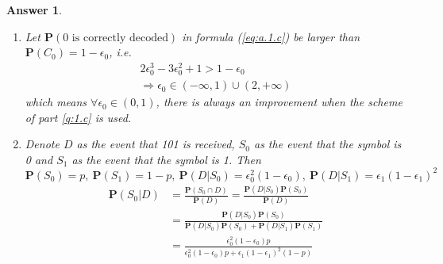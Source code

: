 \documentclass[utf8]{article}
\theoremstyle{definition}%
\theoremstyle{plain}%
\newtheorem{answer}{Answer} %
\begin{document}
\begin{answer}
\begin{enumerate}[label=(\alph*)]
\begin{equation}
    \end{equation}
    Thus, the probability that a 0 is correctly decoded is
    \begin{equation}
    \begin{aligned}
        \label{eq:a.1.c}
        \mathbf{P}(\text{0 is correctly decoded}) &= \mathbf{P}(Z_2) + \mathbf{P}(Z_3) \\
        &= 3(1-\epsilon_0)^2\epsilon_0 + (1-\epsilon_0)^3 \\ 
        &= 2\epsilon_0^3 - 3\epsilon_0^2 + 1
    \end{aligned}
    \end{equation}
    P.S. We do not take the situation into consideration that the sender sends 1 and the receiver decodes it as 0.
    \item Let $\mathbf{P}(\text{0 is correctly decoded})$ in formula (\ref{eq:a.1.c}) be larger than $\mathbf{P}(C_0) = 1-\epsilon_0$, i.e.
    \begin{equation}
    \begin{aligned}
        2\epsilon_0^3 - 3\epsilon_0^2 + 1 > 1-\epsilon_0 \\ 
        \Rightarrow \epsilon_0 \in (-\infty, 1) \cup (2, +\infty)
    \end{aligned}
    \end{equation}
    which means $\forall \epsilon_0 \in (0, 1)$, there is always an improvement when the scheme of part \ref{q:1.c} is used.
    \item Denote $D$ as the event that 101 is received, $S_0$ as the event that the symbol is 0 and $S_1$ as the event that the symbol is 1. Then 
    \begin{equation}
        \mathbf{P}(S_0) = p,~ \mathbf{P}(S_1) = 1-p,~ \mathbf{P}(D | S_0) = \epsilon_0^2(1-\epsilon_0),~ \mathbf{P}(D | S_1) = \epsilon_1(1-\epsilon_1)^2
    \end{equation}
    \begin{equation}
    \begin{aligned}
        \mathbf{P}(S_0 | D) &= \frac{\mathbf{P}(S_0 \cap D)}{\mathbf{P}(D)} = \frac{\mathbf{P}(D | S_0) \mathbf{P}(S_0)}{\mathbf{P}(D)} \\ 
        &= \frac{\mathbf{P}(D | S_0) \mathbf{P}(S_0)}{\mathbf{P}(D | S_0) \mathbf{P}(S_0) + \mathbf{P}(D | S_1) \mathbf{P}(S_1)} \\ 
        &= \frac{\epsilon_0^2(1-\epsilon_0)p}{\epsilon_0^2(1-\epsilon_0)p + \epsilon_1(1-\epsilon_1)^2(1-p)}
    \end{aligned}
    \end{equation}
\end{enumerate}
\end{answer}
\end{document}
